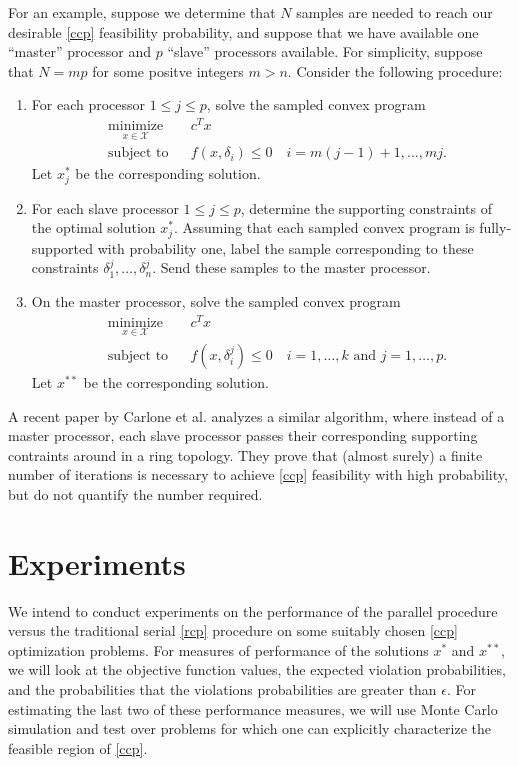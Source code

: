 \documentclass[12pt]{article}
\begin{document}
For an example, suppose we determine that $N$ samples are needed to reach our desirable \ref{ccp} feasibility probability, and suppose that we have available one ``master'' processor
and $p$ ``slave'' processors available.
For simplicity, suppose that $N = mp$ for some positve integers $m > n$.
Consider the following procedure:

\begin{enumerate}
\item For each processor $1 \leq j \leq p$, solve the sampled convex program
\begin{equation*}
\begin{aligned}
    & \underset{x \in \mathcal{X}}{\text{minimize}}
    & & c^T x \\
    & \text{subject to}
    & & f(x,\delta_i) \leq 0 \quad i = m(j-1) + 1, \ldots, mj.
\end{aligned}
\end{equation*}
Let $x_j^*$ be the corresponding solution.
\item For each slave processor $1 \leq j \leq p$, determine the supporting constraints of the 
optimal solution $x_j^*$.
Assuming that each sampled convex program is fully-supported with probability one,
label the sample corresponding to these constraints $\delta_1^j, \ldots, \delta_n^j$.
Send these samples to the master processor.
\item On the master processor, solve the sampled convex program
\begin{equation*}
\begin{aligned}
    & \underset{x \in \mathcal{X}}{\text{minimize}}
    & & c^T x \\
    & \text{subject to}
    & & f(x,\delta_i^j) \leq 0 \quad i = 1,\ldots,k \text{ and } j = 1,\ldots,p.
\end{aligned}
\end{equation*}
Let $x^{**}$ be the corresponding solution.
\end{enumerate}

A recent paper by Carlone et al. \cite{carlone2014} analyzes a similar algorithm, 
where instead of a master processor, each slave processor passes their 
corresponding supporting contraints around in a ring topology.  They prove that 
(almost surely) a finite number of iterations is necessary to achieve \ref{ccp} 
feasibility with high probability, but do not quantify the number required.

\section{Experiments}
We intend to conduct experiments on the performance of the parallel procedure versus the traditional serial \ref{rcp} procedure on some suitably chosen \ref{ccp} optimization problems.
For measures of performance of the solutions $x^*$ and $x^{**}$, we will look at the objective function values, the expected violation probabilities, and the probabilities that the violations probabilities are greater than $\epsilon$.
For estimating the last two of these performance measures, we will use Monte Carlo simulation and test over problems for which one can explicitly characterize the feasible region of \ref{ccp}.
\end{document}
